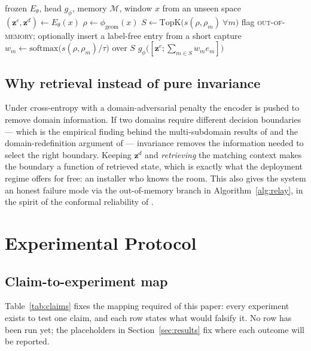 \documentclass[conference]{IEEEtran}
\newcommand{\method}{\textsc{Relay}}
\newcommand{\zc}{\mathbf{z}^{c}}      %
\newcommand{\zd}{\mathbf{z}^{d}}      %
\begin{document}
\begin{algorithm}[t]
\caption{\method{} inference (adaptation = memory insertion, no retraining)}
\label{alg:relay}
\begin{algorithmic}[1]
\Require frozen $E_\theta$, head $g_\phi$, memory $\mathcal{M}$, window $x$ from an unseen space
\State $(\zc, \zd) \gets E_\theta(x)$
\State $\rho \gets \phi_{\mathrm{geom}}(x)$
\State $S \gets \mathrm{TopK}\big(s(\rho,\rho_m)\ \forall m\big)$
                       
    \State flag \textsc{out-of-memory}; optionally insert a label-free entry from a short capture
\EndIf
\State $w_m \gets \mathrm{softmax}\big(s(\rho,\rho_m)/\tau\big)$ over $S$
\State \Return $g_\phi\big([\zc; \textstyle\sum_{m\in S} w_m e_m]\big)$
\end{algorithmic}
\end{algorithm}

\subsection{Why retrieval instead of pure invariance}
Under cross-entropy with a domain-adversarial penalty the encoder is pushed to remove
domain information. If two domains require different decision boundaries --- which is the
empirical finding behind the multi-subdomain results of \cite{Liu2024WiSGP} and the
domain-redefinition argument of \cite{Zhang2026BeyondLabels} --- invariance removes the
information needed to select the right boundary. Keeping $\zd$ and \emph{retrieving} the
matching context makes the boundary a function of retrieved state, which is exactly what
the deployment regime offers for free: an installer who knows the room. This also gives the
system an honest failure mode via the out-of-memory branch in
Algorithm~\ref{alg:relay}, in the spirit of the conformal reliability of
\cite{Li2026Conformal}.

\section{Experimental Protocol}
\label{sec:protocol}

\subsection{Claim-to-experiment map}
Table~\ref{tab:claims} fixes the mapping required of this paper: every experiment exists to
test one claim, and each row states what would falsify it. No row has been run yet; the
placeholders in Section~\ref{sec:results} fix where each outcome will be reported.
\end{document}
